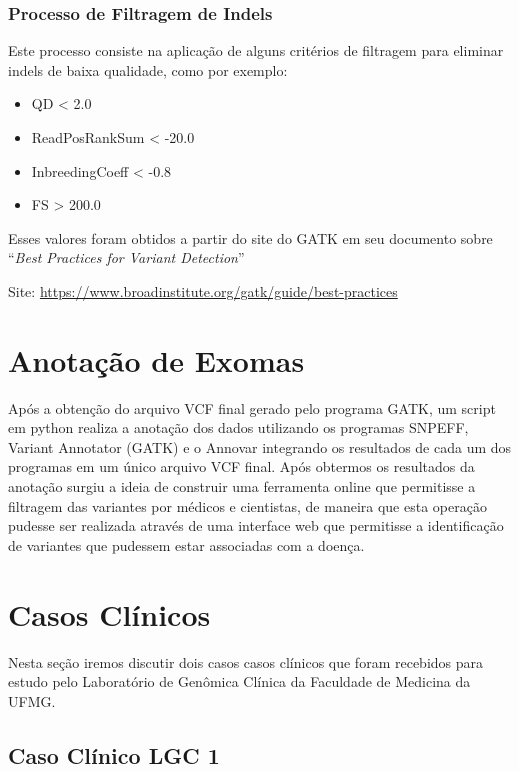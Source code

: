 \subsubsection{Processo de Filtragem de Indels}

Este processo consiste na aplicação de alguns critérios de filtragem para eliminar indels de baixa qualidade, como por exemplo: 

\begin{itemize}
 \item QD < 2.0
 \item ReadPosRankSum < -20.0
 \item InbreedingCoeff < -0.8
 \item FS > 200.0 
\end{itemize}

Esses valores foram obtidos a partir do site do GATK em seu documento sobre ``\textit{Best Practices for Variant Detection}''

Site: \url{https://www.broadinstitute.org/gatk/guide/best-practices}

\section{Anotação de Exomas}

Após a obtenção do arquivo VCF final gerado pelo programa GATK, um script em python realiza a anotação dos dados utilizando os programas SNPEFF, Variant Annotator (GATK) e o Annovar integrando os resultados de cada um dos programas em um único arquivo VCF final. Após obtermos os resultados da anotação surgiu a ideia de construir uma ferramenta online que permitisse a filtragem das variantes por médicos e cientistas, de maneira que esta operação pudesse ser realizada através de uma interface web que permitisse a identificação de variantes que pudessem estar associadas com a doença.




\section{Casos Clínicos}

Nesta seção iremos discutir dois casos casos clínicos que foram recebidos para estudo pelo Laboratório de Genômica Clínica da Faculdade de Medicina da UFMG.

\subsection{Caso Clínico LGC 1}

